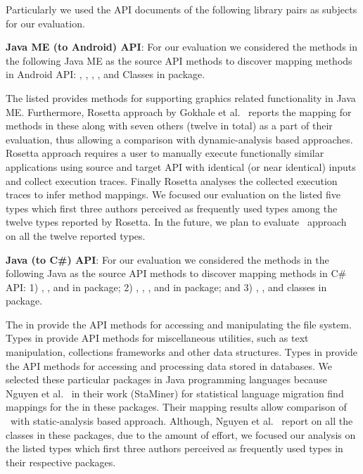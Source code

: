 Particularly we used the API documents of the following library pairs as subjects for our evaluation. 


\textbf{Java ME (to Android) API}:
For our evaluation we considered the methods in the following Java ME  as the source API methods to discover mapping methods in Android API: 
,
,
,
, and
Classes in    package.


The listed  provides methods for supporting graphics related functionality in Java ME.
Furthermore, Rosetta approach by Gokhale et al.~\cite{Gokhale2013ICSE} reports the
mapping for methods in these  along with seven others (twelve  in total) as a part of their evaluation,
thus allowing a comparison with dynamic-analysis based approaches.
Rosetta approach requires a user to manually execute functionally similar applications using source and target API with identical (or near identical) inputs and collect execution traces.
Finally Rosetta analyses the collected execution traces to infer method mappings.
We focused our evaluation on the listed five types which first three authors perceived as frequently used types among the twelve types reported by Rosetta.
In the future, we plan to evaluate \tool\ approach on all the twelve reported types. 

\textbf{Java (to C\#) API}:
For our evaluation we considered the methods in the following Java  as the source API methods to discover mapping methods in C\# API: 
1) ,
, and 
 in  package;
2) ,
,
, and 
 in  package; and
3) ,
, and 
 classes in  package.
 
The  in  provide the API methods for accessing and manipulating the file system.
Types in  provide API methods for miscellaneous utilities, such as text manipulation, collections frameworks and other data structures.
Types in  provide the API methods for accessing and processing data stored in databases.
We selected these particular packages in Java programming languages because Nguyen et al.~\cite{nguyen2014statistical} in their work (StaMiner) for statistical language migration find mappings for the  in these packages.
Their mapping results allow comparison of \tool\ with static-analysis based approach.
Although, Nguyen et al.~\cite{nguyen2014statistical} report on all the classes in these packages,
due to the amount of effort, we focused our analysis on the listed types which first three authors perceived as frequently used types in their respective packages.


